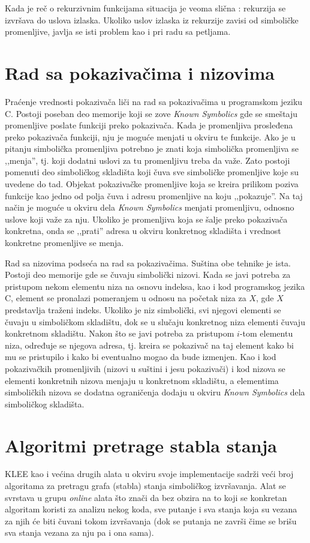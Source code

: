\documentclass[12pt,oneside]{memoir}
\begin{document}
Kada je reč o rekurzivnim funkcijama situacija je veoma slična : rekurzija se izvršava do uslova izlaska. Ukoliko uslov izlaska iz rekurzije zavisi od simboličke promenljive, javlja se isti problem kao i pri radu sa petljama.

\section{Rad sa pokazivačima i nizovima}
Praćenje vrednosti pokazivača liči na rad sa pokazivačima u programskom jeziku C. Postoji poseban deo memorije koji se zove \textit{Known Symbolics} gde se smeštaju promenljive poslate funkciji preko pokazivača. Kada je promenljiva prosleđena preko pokazivača funkciji, nju je moguće menjati u okviru te funkcije. Ako je u pitanju simbolička promenljiva potrebno je znati koja simbolička promenljiva se ,,menja'', tj. koji dodatni uslovi za tu promenljivu treba da važe. Zato postoji pomenuti deo simboličkog skladišta koji čuva sve simboličke promenljive koje su uvedene do tad. Objekat pokazivačke promenljive koja se kreira prilikom poziva funkcije kao jedno od polja čuva i adresu promenljive na koju ,,pokazuje''. Na taj način je moguće u okviru dela \textit{Known Symbolics} menjati promenljivu, odnosno uslove koji važe za nju. Ukoliko je promenljiva koja se šalje preko pokazivača konkretna, onda se ,,prati'' adresa u okviru konkretnog skladišta i vrednost konkretne promenljive se menja.

Rad sa nizovima podseća na rad sa pokazivačima. Suština obe tehnike je ista. Postoji deo memorije gde se čuvaju simbolički nizovi. Kada se javi potreba za pristupom nekom elementu niza na osnovu indeksa, kao i kod programskog jezika C, element se pronalazi pomeranjem u odnosu na početak niza za $X$, gde $X$ predstavlja traženi indeks. Ukoliko je niz simbolički, svi njegovi elementi se čuvaju u simboličkom skladištu, dok se u slučaju konkretnog niza elementi čuvaju konkretnom skladištu. Nakon što se javi potreba za pristupom $i$-tom elementu niza, određuje se njegova adresa, tj. kreira se pokazivač na taj element kako bi mu se pristupilo i kako bi eventualno mogao da bude izmenjen. Kao i kod pokazivačkih promenljivih (nizovi u suštini i jesu pokazivači) i kod nizova se elementi konkretnih nizova menjaju u konkretnom skladištu, a elementima simboličkih nizova se dodatna ograničenja dodaju u okviru \textit{Known Symbolics} dela simboličkog skladišta.  

\section{Algoritmi pretrage stabla stanja} \label{algoritmi}
KLEE kao i većina drugih alata u okviru svoje implementacije sadrži veći broj algoritama za pretragu grafa (stabla) stanja simboličkog izvršavanja. Alat se svrstava u grupu \textit{online} alata što znači da bez obzira na to koji se konkretan algoritam koristi za analizu nekog koda, sve putanje i sva stanja koja su vezana za njih će biti čuvani tokom izvršavanja (dok se putanja ne završi čime se brišu sva stanja vezana za nju pa i ona sama).
\end{document}
